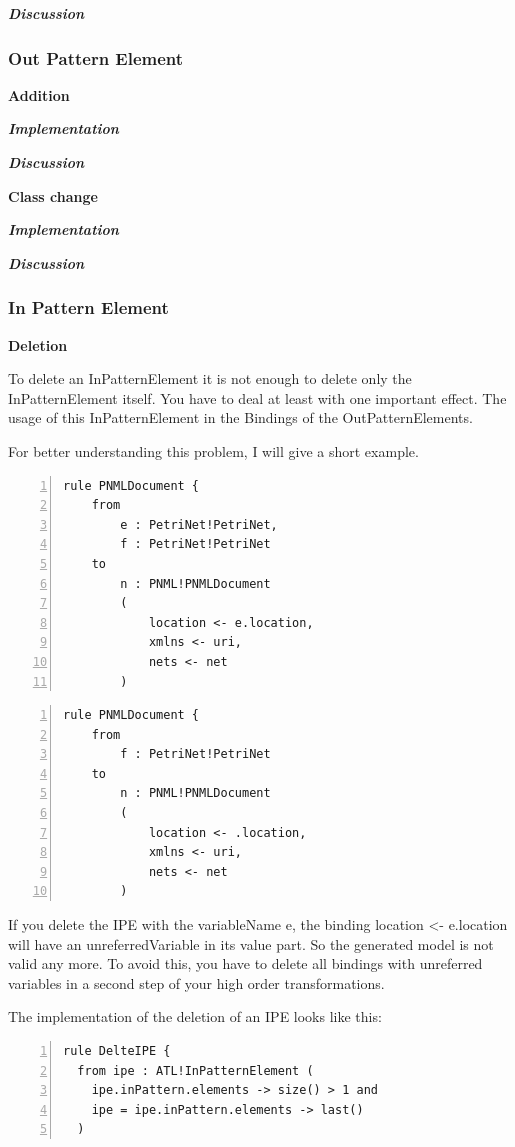 \documentclass{llncs}
\begin{document}
\textbf\textit{{Discussion}}

\subsubsection{Out Pattern Element}

\textbf{Addition}

\textbf\textit{{Implementation}}

\textbf\textit{{Discussion}}

\textbf{Class change}

\textbf\textit{{Implementation}}

\textbf\textit{{Discussion}}

\subsubsection{In Pattern Element}

\textbf{Deletion}

To delete an InPatternElement it is not enough to delete only the InPatternElement itself. You have to deal at least with one important effect. The usage of this InPatternElement in the Bindings of the OutPatternElements.

For better understanding this problem, I will give a short example.

\begin{lstlisting}[language=ATL, numbers=left,xleftmargin=5.0ex]
rule PNMLDocument {
	from
		e : PetriNet!PetriNet,
		f : PetriNet!PetriNet
	to	
		n : PNML!PNMLDocument
		(
			location <- e.location,
			xmlns <- uri,
			nets <- net			
		)
\end{lstlisting}

\begin{lstlisting}[language=ATL, numbers=left,xleftmargin=5.0ex]
rule PNMLDocument {
	from
		f : PetriNet!PetriNet
	to	
		n : PNML!PNMLDocument
		(
			location <- .location,
			xmlns <- uri,
			nets <- net			
		)
\end{lstlisting}

If you delete the IPE with the variableName e, the binding location <- e.location will have an unreferredVariable in its value part. So the generated model is not valid any more. To avoid this, you have to delete all bindings with unreferred variables in a second step of your high order transformations.

The implementation of the deletion of an IPE looks like this:
\begin{lstlisting}[language=ATL, numbers=left,xleftmargin=5.0ex]
rule DelteIPE {
  from ipe : ATL!InPatternElement (
    ipe.inPattern.elements -> size() > 1 and
    ipe = ipe.inPattern.elements -> last()
  )
\end{lstlisting}
\end{document}
